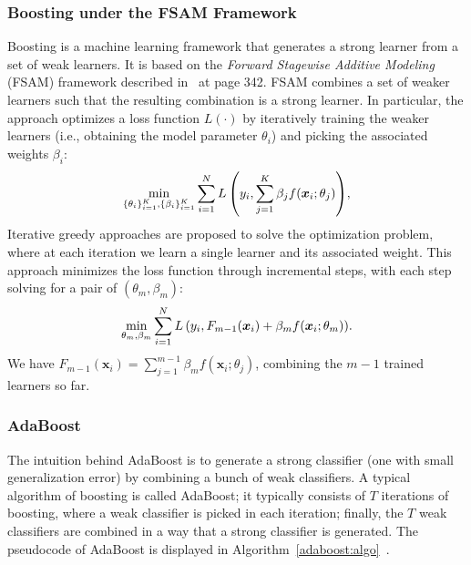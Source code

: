     \subsubsection{Boosting under the FSAM Framework}\label{sec:boosting-trees}
    Boosting is a machine learning framework that generates a strong learner  from a set of weak learners. 
    It is based on the \textit{Forward Stagewise Additive Modeling} (FSAM) framework described in~\cite{hastie2009elements} at page 342. 
    FSAM combines a set of weaker learners such that the resulting combination is a strong learner. 
    In particular, the approach optimizes a loss function $L(\cdot)$  by iteratively training the weaker learners (i.e., obtaining the model parameter $\theta_i$) and picking the associated weights $\beta_i$:
            \begin{equation}
                \min_{\{ \theta_i \}_{i=1}^{K}, \{ \beta_i \}_{i=1}^{K} } \sum_{i=1}^{N}{L\left( y_i, \sum_{j=1}^{K}{\beta_j f(\bm{x}_i; \theta_j)} \right)},
            \end{equation}
        Iterative greedy approaches are proposed to solve the optimization problem, where at each iteration we learn a single learner and its associated weight. 
        This approach minimizes the loss function through  incremental steps,  with each step solving for a pair of $(\theta_m, \beta_m)$:
            \begin{equation}\label{eq:forward-stagewise-add-model}
                \min_{\theta_m, \beta_m} \sum_{i=1}^{N}{
                    L\left( y_i, F_{m-1}(\bm{x}_i) + \beta_m f(\bm{x}_i; \theta_m) \right)
                }.
            \end{equation}
        We have $F_{m-1}(\bm{x}_i) = \sum_{j=1}^{m-1}{\beta_m f(\bm{x}_i; \theta_j)}$, combining the $m-1$  trained learners so far.
        
        

        
\subsubsection{AdaBoost}
The intuition behind AdaBoost is to generate a strong classifier (one with small generalization error) by combining a bunch of weak classifiers. 
A typical algorithm of boosting is called AdaBoost; it typically consists of $T$ iterations of boosting, where a weak classifier is picked in each iteration; finally, the $T$ weak classifiers are combined in a way that a strong classifier is generated. 
The pseudocode of AdaBoost is displayed in Algorithm~\ref{adaboost:algo}~\cite{mohri2018foundations}.

